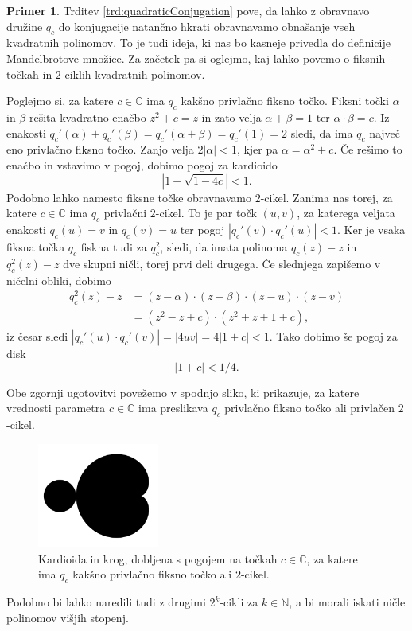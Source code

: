 \documentclass[12pt,a4paper]{amsart}
\theoremstyle{definition} %
\newtheorem{primer}[definicija]{Primer}
\theoremstyle{plain} %
\newcommand{\N}{\mathbb N}
\newcommand{\CC}{\mathbb C}
\begin{document}
\begin{primer}\label{primer:QuadFixCyc}
Trditev \ref{trd:quadraticConjugation} pove, 
da lahko z obravnavo družine $q_c$ do konjugacije natančno hkrati obravnavamo obnašanje vseh kvadratnih polinomov. 
To je tudi ideja, ki nas bo kasneje privedla do definicije Mandelbrotove množice. 
Za začetek pa si oglejmo, kaj lahko povemo o fiksnih točkah in $2$-ciklih kvadratnih polinomov.

Poglejmo si, za katere $c \in \CC$ ima $q_c$ kakšno privlačno fiksno točko.
Fiksni točki $\alpha$ in $\beta$ rešita kvadratno enačbo $z^2 + c = z$ in zato velja 
$\alpha + \beta = 1$ ter $\alpha\cdot\beta = c$.
Iz enakosti $q_c'(\alpha) + q_c'(\beta) = q_c'(\alpha + \beta) = q_c'(1) = 2$
sledi, da ima $q_c$ največ eno privlačno fiksno točko.
Zanjo velja $2|\alpha| < 1$,  kjer pa $\alpha = \alpha^2 + c$. 
Če rešimo to enačbo in vstavimo v pogoj, dobimo pogoj za kardioido
$$|1\pm\sqrt{1 - 4c}| < 1.$$
Podobno lahko namesto fiksne točke obravnavamo $2$-cikel.
Zanima nas torej, za katere $c\in\CC$ ima $q_c$ privlačni $2$-cikel.
To je par točk $(u, v)$, za katerega veljata enakosti 
$q_c(u) = v$ in $q_c(v) = u$ ter pogoj $|q_c'(v)\cdot q_c'(u)| < 1.$
Ker je vsaka fiksna točka $q_c$ fiskna tudi za $q_c^2$, sledi, 
da imata polinoma $q_c(z) - z$ in $q_c^2(z) - z$ dve skupni ničli, torej prvi deli drugega.
Če slednjega zapišemo v ničelni obliki, dobimo
\begin{align*}
q_c^2(z) - z &= (z - \alpha)\cdot(z - \beta)\cdot(z - u) \cdot (z - v)  \\
&=  (z^2 - z + c)\cdot(z^2 + z + 1 + c),
\end{align*}
iz česar sledi
$|q_c'(u)\cdot q_c'(v)| = |4uv| = 4|1 + c| < 1.$
Tako dobimo še pogoj za disk
$$|1 + c| < 1/4.$$ 

Obe zgornji ugotovitvi povežemo v spodnjo sliko, ki prikazuje, za katere vrednosti parametra 
$c\in\CC$ ima preslikava $q_c$ privlačno fiksno točko ali privlačen $2$-cikel.

\begin{figure}[h]
\includegraphics[width=4cm]{graphics/CardioidCircle.png}
\caption{
Kardioida in krog, dobljena s pogojem na točkah $c\in\CC$, 
za katere ima $q_c$ kakšno privlačno fiksno točko ali $2$-cikel.
}
\end{figure}
\noindent Podobno bi lahko naredili tudi z drugimi $2^k$-cikli
za $k\in\N$, a bi morali iskati ničle polinomov višjih stopenj.
\end{primer}
\end{document}
